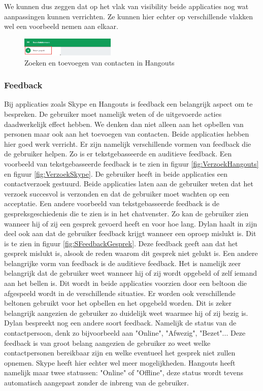 \documentclass[11pt]{article}
\begin{document}
\newline
We kunnen dus zeggen dat op het vlak van visibility beide applicaties nog wat aanpassingen kunnen verrichten. Ze kunnen hier echter op verschillende vlakken wel een voorbeeld nemen aan elkaar.
\begin{figure}
	\centering
	\includegraphics[width=0.4\textwidth]{Samen_HangoutsNew.png}
	\caption{Zoeken en toevoegen van contacten in Hangouts}
	\label{fig:HangoutsNew}
\end{figure}
\subsubsection{Feedback}
Bij applicaties zoals Skype en Hangouts is feedback een belangrijk aspect om te bespreken. De gebruiker moet namelijk weten of de uitgevoerde acties daadwerkelijk effect hebben. We denken dan niet alleen aan het opbellen van personen maar ook aan het toevoegen van contacten. 
\newline
Beide applicaties hebben hier goed werk verricht. Er zijn namelijk verschillende vormen van feedback die de gebruiker helpen. Zo is er tekstgebasseerde en auditieve feedback.
\newline
Een voorbeeld van tekstgebasseerde feedback is te zien in figuur \ref{fig:VerzoekHangouts} en figuur \ref{fig:VerzoekSkype}. De gebruiker heeft in beide applicaties een contactverzoek gestuurd. Beide applicaties laten aan de gebruiker weten dat het verzoek succesvol is verzonden en dat de gebruiker moet wachten op een acceptatie. Een andere voorbeeld van tekstgebasseerde feedback is de gespreksgeschiedenis die te zien is in het chatvenster. Zo kan de gebruiker zien wanneer hij of zij een gesprek gevoerd heeft en voor hoe lang. Dylan haalt in zijn deel ook aan dat de gebruiker feedback krijgt wanneer een oproep mislukt is. Dit is te zien in figuur \ref{fig:SFeedbackGesprek}. Deze feedback geeft aan dat het gesprek mislukt is, alsook de reden waarom dit gesprek niet gelukt is.
\newline
Een andere belangrijke vorm van feedback is de auditieve feedback. Het is namelijk zeer belangrijk dat de gebruiker weet wanneer hij of zij wordt opgebeld of zelf iemand aan het bellen is. Dit wordt in beide applicaties voorzien door een beltoon die afgespeeld wordt in de verschillende situaties. Er worden ook verschillende beltonen gebruikt voor het opbellen en het opgebeld worden. Dit is zeker belangrijk aangezien de gebruiker zo duidelijk weet waarmee hij of zij bezig is. 
\newline
Dylan bespreekt nog een andere soort feedback. Namelijk de status van de contactpersoon, denk zo bijvoorbeeld aan "Online", "Afwezig", "Bezet"... Deze feedback is van groot belang aangezien de gebruiker zo weet welke contactpersonen bereikbaar zijn en welke eventueel het gesprek niet zullen opnemen. Skype heeft hier echter wel meer mogelijkheden. Hangouts heeft namelijk maar twee statussen: "Online" of "Offline", deze status wordt tevens automatisch aangepast zonder de inbreng van de gebruiker. 
\end{document}
